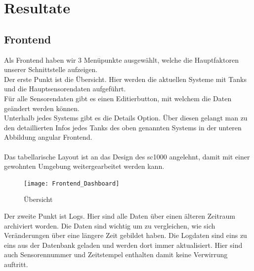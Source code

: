 \documentclass[../main.tex]{subfiles}
\begin{document}
	\section{Resultate}
	
	\subsection{Frontend}
	
	Als Frontend haben wir 3 Menüpunkte ausgewählt, welche die Hauptfaktoren unserer Schnittstelle aufzeigen. \\
	Der erste Punkt ist die Übersicht. Hier werden die aktuellen Systeme mit Tanks und die Hauptsensorendaten aufgeführt. \\
	Für alle Sensorendaten gibt es einen Editierbutton, mit welchem die Daten geändert werden können.\\
	Unterhalb jedes Systems gibt es die Details Option. Über diesen gelangt man zu den detaillierten Infos jedes Tanks des oben genannten Systems in der unteren Abbildung \gls{angular} Frontend. \\ \\
	Das tabellarische Layout ist an das Design des \gls{sc1000} angelehnt, damit mit einer gewohnten Umgebung weitergearbeitet werden kann. 
	\begin{figure}[H]
		\centering
		\texttt{[image: Frontend\_Dashboard]}
		\caption{Übersicht}
		\label{fig:Frontend_Dashboard}
	\end{figure}
	\par
	\noindent
	Der zweite Punkt ist Logs. Hier sind alle Daten über einen älteren Zeitraum archiviert worden. Die Daten sind wichtig um zu vergleichen, wie sich Veränderungen über eine längere Zeit gebildet haben. Die Logdaten sind eins zu eins aus der Datenbank geladen und werden dort immer aktualisiert. Hier sind auch Sensorennummer und Zeitstempel enthalten damit keine Verwirrung auftritt.
	
\end{document}
